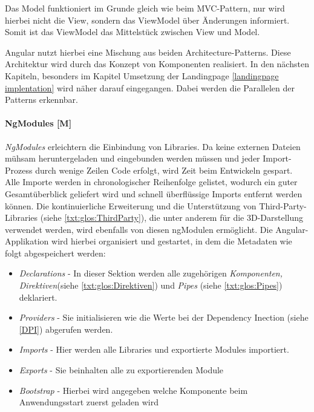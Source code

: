 Das Model funktioniert im Grunde gleich wie beim MVC-Pattern, nur wird hierbei nicht die View, sondern das ViewModel über Änderungen informiert. Somit ist das ViewModel das Mittelstück zwischen View und Model.

Angular nutzt hierbei eine Mischung aus beiden Architecture-Patterns. Diese Architektur wird durch das Konzept von Komponenten realisiert. In den nächsten Kapiteln, besonders im Kapitel Umsetzung der Landingpage \ref{landingpage implentation} wird näher darauf eingegangen. Dabei werden die Parallelen der Patterns erkennbar.
\cite{MVVM}

\paragraph{NgModules [M]}\label{sec:NgModules}
\emph{NgModules} erleichtern die Einbindung von Libraries. Da keine externen Dateien mühsam heruntergeladen und eingebunden werden müssen und jeder Import-Prozess durch wenige Zeilen Code erfolgt, wird Zeit beim Entwickeln gespart. Alle Importe werden in chronologischer Reihenfolge gelistet, wodurch ein guter Gesamtüberblick geliefert wird und schnell überflüssige Imports entfernt werden können. Die kontinuierliche Erweiterung und die Unterstützung von Third-Party-Libraries (siehe \ref{txt:glos:ThirdParty}), die unter anderem für die 3D-Darstellung verwendet werden, wird ebenfalls von diesen ngModulen ermöglicht. Die Angular-Applikation wird hierbei organisiert und gestartet, in dem die Metadaten wie folgt abgespeichert werden:

\begin{itemize}
  \item \emph{Declarations} - In dieser Sektion werden alle zugehörigen \emph{Komponenten, Direktiven}(siehe \ref{txt:glos:Direktiven}) und \emph{Pipes} (siehe \ref{txt:glos:Pipes}) deklariert. 
  \item \emph{Providers} - Sie initialisieren wie die Werte bei der Dependency Inection (siehe \ref{DPI}) abgerufen werden. \cite{AngularProviders}
  \item \emph{Imports} - Hier werden alle Libraries und exportierte Modules importiert.
  \item \emph{Exports} - Sie beinhalten alle zu exportierenden Module
  \item \emph{Bootstrap} - Hierbei wird angegeben welche Komponente beim Anwendungsstart zuerst geladen wird
\end{itemize}

